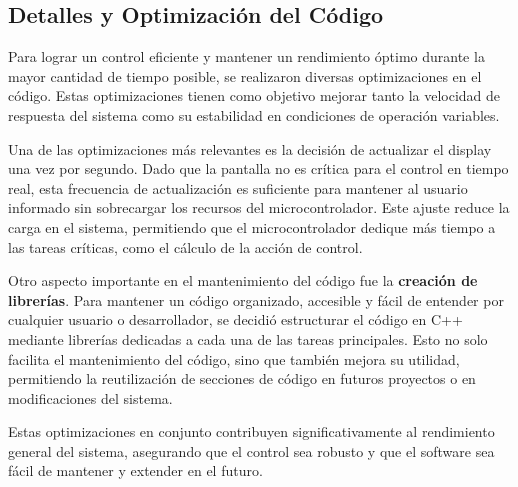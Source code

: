 \subsection{Detalles y Optimización del Código}
Para lograr un control eficiente y mantener un rendimiento óptimo durante la mayor cantidad de tiempo posible, se realizaron diversas optimizaciones en el código. Estas optimizaciones tienen como objetivo mejorar tanto la velocidad de respuesta del sistema como su estabilidad en condiciones de operación variables. \par
Una de las optimizaciones más relevantes es la decisión de actualizar el display una vez por segundo. Dado que la pantalla no es crítica para el control en tiempo real, esta frecuencia de actualización es suficiente para mantener al usuario informado sin sobrecargar los recursos del microcontrolador. Este ajuste reduce la carga en el sistema, permitiendo que el microcontrolador dedique más tiempo a las tareas críticas, como el cálculo de la acción de control.\par
Otro aspecto importante en el mantenimiento del código fue la \textbf{creación de librerías}. Para mantener un código organizado, accesible y fácil de entender por cualquier usuario o desarrollador, se decidió estructurar el código en C++ mediante librerías dedicadas a cada una de las tareas principales. Esto no solo facilita el mantenimiento del código, sino que también mejora su utilidad, permitiendo la reutilización de secciones de código en futuros proyectos o en modificaciones del sistema. \par
Estas optimizaciones en conjunto contribuyen significativamente al rendimiento general del sistema, asegurando que el control sea robusto y que el software sea fácil de mantener y extender en el futuro.\par
